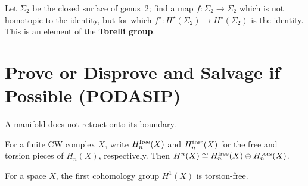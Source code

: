 \documentclass{homework}
\begin{document}
\begin{problem}
  Let $\Sigma_2$ be the closed surface of genus~$2$; find a map $f :
  \Sigma_2 \to \Sigma_2$ which is not homotopic to the identity, but
  for which $f^\star : H^\star(\Sigma_2) \to H^\star(\Sigma_2)$ is the
  identity.  This is an element of the \textbf{Torelli group}.
\end{problem}

\section{Prove or Disprove and Salvage if Possible (PODASIP)}

\begin{problem}
  A manifold does not retract onto its boundary.
\end{problem}

\begin{problem}
  For a finite CW complex $X$, write
  $H^{\mbox{\scriptsize free}}_n(X)$ and 
  $H^{\mbox{\scriptsize tors}}_n(X)$ for the free and torsion pieces of $H_n(X)$, respectively.
  Then $H^n(X) \cong  
  H^{\mbox{\scriptsize free}}_n(X) \oplus
  H^{\mbox{\scriptsize tors}}_n(X)$.
\end{problem}

\begin{problem}
  For a space $X$, the first cohomology group $H^1(X)$ is torsion-free.
  \end{problem}
\end{document}
